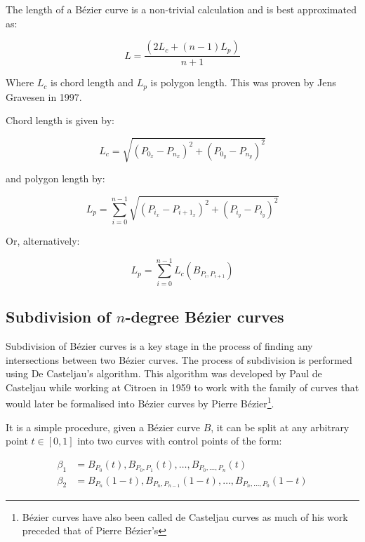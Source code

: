 The length of a Bézier curve is a non-trivial calculation and is best approximated as:

\begin{equation}
    L = \frac{(2L_c + (n-1)L_p)}{n+1}
\end{equation}

Where $L_c$ is chord length and $L_p$ is polygon length. This was proven by Jens Gravesen\cite{gravesenAdaptiveSubdivisionLength1997} in 1997.

Chord length is given by:

\begin{equation}\label{eq:bezlength}
  L_{c} = \sqrt{\left(P_{0_{x}} - P_{n_{x}}\right)^{2} + \left(P_{0_{y}} - P_{n_{y}}\right)^{2}}
\end{equation}

and polygon length by:

\begin{equation}
  L_{p} = \sum_{i=0}^{n-1} \sqrt{\left(P_{i_{x}} - P_{i+1_{x}}\right)^{2} + \left(P_{i_{y}} - P_{i_{y}}\right)^{2}}
\end{equation}

Or, alternatively:

\begin{equation}
  L_{p} = \sum_{i=0}^{n-1} L_{c}(B_{P_{i},P_{i+1}})
\end{equation}

\subsection{Subdivision of $n$-degree Bézier curves}

Subdivision of Bézier curves is a key stage in the process of finding any intersections between two Bézier curves. The process of subdivision is performed using De Casteljau's algorithm. This algorithm was developed by Paul de Casteljau while working at Citroen in 1959 to work with the family of curves that would later be formalised into Bézier curves by Pierre Bézier\footnote{Bézier curves have also been called de Casteljau curves as much of his work preceded that of Pierre Bézier's}.

It is a simple procedure, given a Bézier curve $B$, it can be split at any arbitrary point $t \in [0,1]$ into two curves with control points of the form:

\begin{align}
  \beta_{1} &= B_{P_{0}}(t), B_{P_{0},P_1}(t), \ldots, B_{P_{0},\ldots,P_{n}}(t) \\
  \beta_{2} &= B_{P_{n}}(1-t), B_{P_{n},P_{n-1}}(1-t), \ldots, B_{P_{n},\ldots,P_{0}}(1-t)
\end{align}

